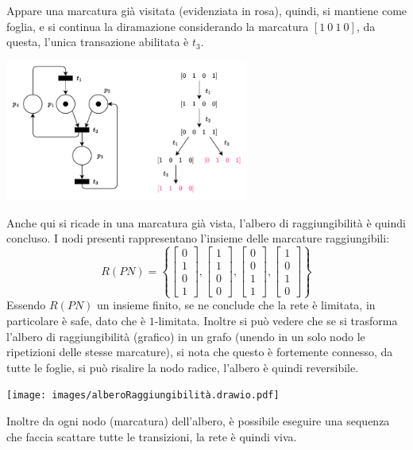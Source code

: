 \documentclass[10pt, letterpaper]{report}
\begin{document}
Appare una marcatura già visitata (evidenziata in rosa), quindi, si mantiene come foglia, e si continua la diramazione considerando la marcatura $[1 \ 0 \ 1 \ 0]$, da questa, l'unica transazione abilitata è $t_3$.
\begin{center}
    \includegraphics[width=0.6\textwidth]{images/alberoRag5.drawio.pdf}
\end{center}
Anche qui si ricade in una marcatura già vista, l'albero di raggiungibilità è quindi concluso. I nodi presenti rappresentano l'insieme delle marcature raggiungibili:
$$ R(PN)= \left\{   \begin{bmatrix}0\\ 1 \\ 0 \\ 1 \end{bmatrix},
\begin{bmatrix}1\\ 1 \\ 0 \\ 0 \end{bmatrix} ,
\begin{bmatrix}0\\ 0 \\ 1 \\ 1 \end{bmatrix} ,
\begin{bmatrix}1\\ 0 \\ 1 \\ 0 \end{bmatrix} 
\right\} $$
Essendo $R(PN)$ un insieme finito, se ne conclude che la rete è limitata, in particolare è safe, dato che è $1$-limitata. Inoltre si può vedere che se si trasforma l'albero di raggiungibilità (grafico) in un grafo (unendo in un solo nodo le ripetizioni delle stesse marcature), si nota che questo è fortemente connesso, da tutte le foglie, si può risalire la nodo radice, l'albero è quindi reversibile.
\begin{center}
    \texttt{[image: images/alberoRaggiungibilità.drawio.pdf]}
\end{center}
Inoltre da ogni nodo (marcatura) dell'albero, è possibile eseguire una sequenza che faccia scattare tutte le transizioni, la rete è quindi viva. 
\end{document}
